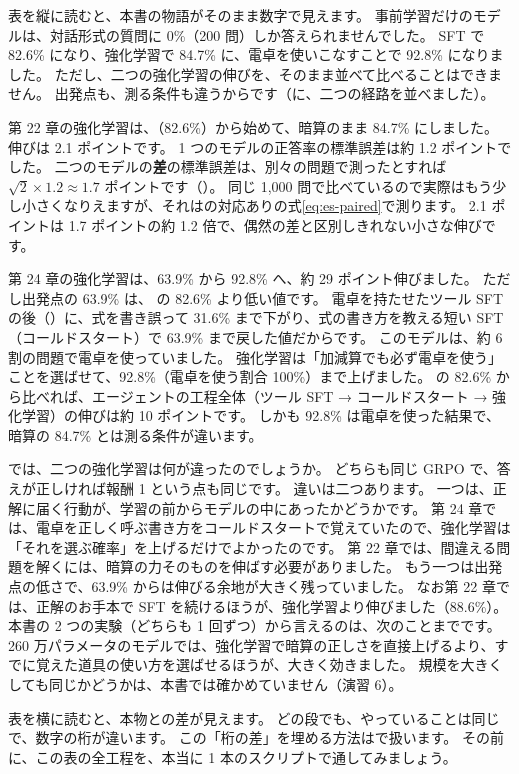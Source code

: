 表を縦に読むと、本書の物語がそのまま数字で見えます。
事前学習だけのモデルは、対話形式の質問に 0\%（200 問）しか答えられませんでした。
SFT で 82.6\% になり、強化学習で 84.7\% に、電卓を使いこなすことで 92.8\% になりました。
ただし、二つの強化学習の伸びを、そのまま並べて比べることはできません。
出発点も、測る条件も違うからです（に、二つの経路を並べました）。

第 22 章の強化学習は、（82.6\%）から始めて、暗算のまま 84.7\% にしました。伸びは 2.1 ポイントです。
1 つのモデルの正答率の標準誤差は約 1.2 ポイントでした。
二つのモデルの\textbf{差}の標準誤差は、別々の問題で測ったとすれば $\sqrt2\times1.2\approx1.7$ ポイントです（）。
同じ 1,000 問で比べているので実際はもう少し小さくなりえますが、それはの対応ありの式\eqref{eq:es-paired}で測ります。
2.1 ポイントは 1.7 ポイントの約 1.2 倍で、偶然の差と区別しきれない小さな伸びです。

第 24 章の強化学習は、63.9\% から 92.8\% へ、約 29 ポイント伸びました。
ただし出発点の 63.9\% は、 の 82.6\% より低い値です。
電卓を持たせたツール SFT の後（）に、式を書き誤って 31.6\% まで下がり、式の書き方を教える短い SFT（コールドスタート）で 63.9\% まで戻した値だからです。
このモデルは、約 6 割の問題で電卓を使っていました。
強化学習は「加減算でも必ず電卓を使う」ことを選ばせて、92.8\%（電卓を使う割合 100\%）まで上げました。
 の 82.6\% から比べれば、エージェントの工程全体（ツール SFT → コールドスタート → 強化学習）の伸びは約 10 ポイントです。
しかも 92.8\% は電卓を使った結果で、暗算の 84.7\% とは測る条件が違います。

では、二つの強化学習は何が違ったのでしょうか。
どちらも同じ GRPO で、答えが正しければ報酬 1 という点も同じです。
違いは二つあります。
一つは、正解に届く行動が、学習の前からモデルの中にあったかどうかです。
第 24 章では、電卓を正しく呼ぶ書き方をコールドスタートで覚えていたので、強化学習は「それを選ぶ確率」を上げるだけでよかったのです。
第 22 章では、間違える問題を解くには、暗算の力そのものを伸ばす必要がありました。
もう一つは出発点の低さで、63.9\% からは伸びる余地が大きく残っていました。
なお第 22 章では、正解のお手本で SFT を続けるほうが、強化学習より伸びました（88.6\%）。
本書の 2 つの実験（どちらも 1 回ずつ）から言えるのは、次のことまでです。
260 万パラメータのモデルでは、強化学習で暗算の正しさを直接上げるより、すでに覚えた道具の使い方を選ばせるほうが、大きく効きました。
規模を大きくしても同じかどうかは、本書では確かめていません（演習 6）。

表を横に読むと、本物との差が見えます。
どの段でも、やっていることは同じで、数字の桁が違います。
この「桁の差」を埋める方法はで扱います。
その前に、この表の全工程を、本当に 1 本のスクリプトで通してみましょう。

